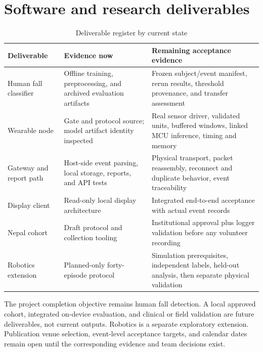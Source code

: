 \section{Software and research deliverables}
\begin{table}[H]
\centering\small
\caption{Deliverable register by current state}
\label{tab:deliverables}
\begin{tabular}{p{3.2cm}p{4.2cm}p{4.7cm}}
\hline
Deliverable & Evidence now & Remaining acceptance evidence \\
\hline
Human fall classifier & Offline training, preprocessing, and archived evaluation artifacts & Frozen subject/event manifest, rerun results, threshold provenance, and transfer assessment \\
Wearable node & Gate and protocol source; model artifact identity inspected & Real sensor driver, validated units, buffered windows, linked MCU inference, timing and memory \\
Gateway and report path & Host-side event parsing, local storage, reports, and API tests & Physical transport, packet reassembly, reconnect and duplicate behavior, event traceability \\
Display client & Read-only local display architecture & Integrated end-to-end acceptance with actual event records \\
Nepal cohort & Draft protocol and collection tooling & Institutional approval plus logger validation before any volunteer recording \\
Robotics extension & Planned-only forty-episode protocol & Simulation prerequisites, independent labels, held-out analysis, then separate physical validation \\
\hline
\end{tabular}
\end{table}

The project completion objective remains human fall detection. A local approved cohort, integrated on-device evaluation, and clinical or field validation are future deliverables, not current outputs. Robotics is a separate exploratory extension. Publication venue selection, event-level acceptance targets, and calendar dates remain open until the corresponding evidence and team decisions exist.
